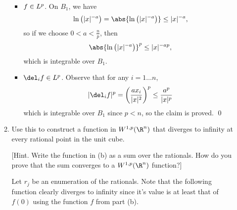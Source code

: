 \documentclass[12pt,letterpaper]{article}
\begin{document}
\begin{enumerate}
\begin{enumerate}[label=(\alph*)]
		\begin{itemize}
		\item $f\in L^p$. On $B_1$, we have 
		$$\ln\left(|x|^{-a}\right)=\abs{\ln\left(|x|^{-a}\right)}\leq|x|^{-a},$$
		so if we choose $0<a<\frac{n}{p}$, then 
		$$\abs{\ln\left(|x|^{-a}\right)}^p\leq|x|^{-ap},$$
		which is integrable over $B_1$. 
		
		\item $\del_i f\in L^p$. Observe that for any $i=1\dots n$, 
		$$|\del_i f|^p=\left(\frac{ax_i}{|x|^2}\right)^p\leq \frac{a^p}{|x|^p}$$
		which is integrable over $B_1$ since $p<n$, so the claim is proved. \qed
		\end{itemize}	  

	\item Use this to construct a function in $W^{1,p}(\Rn)$ that diverges to infinity at every rational point in the unit cube. 
	
	[Hint. Write the function in (b) as a sum over the rationals. How do you prove that the sum converges to a $W^{1,p}(\Rn)$ function?]
	
	\answer Let $r_j$ be an enumeration of the rationals. Note that the following function clearly diverges to infinity since it's value is at least that of $f(0)$ using the function $f$ from part (b).
	\end{enumerate}
\end{enumerate}
\end{document}
